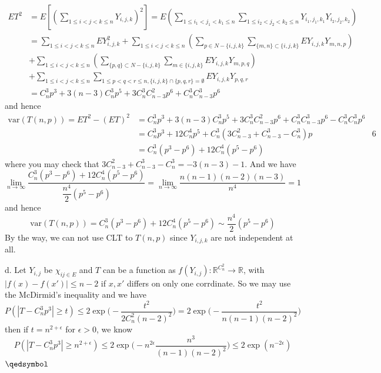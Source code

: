 \documentclass[lang=en,11pt,a4paper,citestyle =authoryear]{elegantpaper}
\newcommand{\prvd}{$\hfill \qedsymbol$}
\newcommand{\R}{\mathbb{R}}
\begin{document}
\[\begin{aligned}
ET^2 &= E[(\sum\limits_{1\leq i < j < k \leq n} Y_{i,j,k})^2] = E(\sum\limits_{1\leq i_1 < j_1 < k_1 \leq n}\sum\limits_{1\leq i_2 < j_2 < k_2 \leq n} Y_{i_1,j_1,k_1} Y_{i_2,j_2,k_2}) \\
&= \sum\limits_{1\leq i < j < k \leq n} EY_{i,j,k}^2 + \sum\limits_{1\leq i < j < k\leq n} (\sum\limits_{p\in N-\{i,j,k\}}\sum\limits_{\{m,n\} \subset \{i,j,k\}}EY_{i,j,k}Y_{m,n,p}) \\
&+ \sum\limits_{1\leq i < j < k\leq n} (\sum\limits_{\{p,q\}\subset N-\{i,j,k\}}\sum\limits_{m\in\{i,j,k\}}EY_{i,j,k}Y_{m,p,q}) \\
&+ \sum\limits_{1\leq i < j < k \leq n} \sum\limits_{1\leq p < q < r \leq n, \{i,j,k\}\cap\{p,q,r\} = \emptyset} EY_{i,j,k}Y_{p,q,r} \\
&= C_n^3 p^3 + 3(n-3)C_n^3 p^5 + 3C_n^3C_{n-3}^2p^6 + C_n^3C_{n-3}^3p^6
\end{aligned}
\]
and hence
\[
\begin{aligned}
\text{var}(T(n,p)) = ET^2 -(ET)^2 &= C_n^3 p^3 + 3(n-3)C_n^3 p^5 + 3C_n^3C_{n-3}^2p^6 + C_n^3C_{n-3}^3p^6 - C_n^3C_n^3 p^6 \\
&= C_n^3 p^3 + 12 C_n^4 p^5 + C_n^3(3C_{n-3}^2 + C_{n-3}^3 - C_n^3)p&6 \\
&= C_n^3(p^3-p^6) + 12 C_n^4(p^5-p^6)
\end{aligned}
\]
where you may check that $3C_{n-3}^2 + C_{n-3}^3 - C_n^3 = -3(n-3)-1$. And we have
\[
\lim_{n\to\infty}  \dfrac{C_n^3(p^3-p^6) + 12 C_n^4(p^5-p^6)}{\dfrac{n^4}{2}(p^5-p^6)} = \lim_{n\to\infty} \dfrac{n(n-1)(n-2)(n-3)}{n^4} = 1
\]
and hence 
\[\text{var}(T(n,p)) = C_n^3(p^3-p^6) + 12 C_n^4(p^5-p^6) \sim \dfrac{n^4}{2}(p^5-p^6)\]
By the way, we can not use CLT to $T(n,p)$ since $Y_{i,j,k}$ are not independent at all.\par
d. Let $Y_{i,j}$ be $\chi_{ij\in E}$ and $T$ can be a function as $f(Y_{i,j}):\R^{C_n^2} \to \R$, with $|f(x)-f(x')| \leq n-2$ if $x,x'$ differs on only one corrdinate. So we may use the McDirmid's inequality and we have
\[
P(|T-C_n^3p^3| \geq t) \leq 2\exp\Big(-\dfrac{t^2}{2C_n^2(n-2)^2}\Big) = 2\exp\Big(-\dfrac{t^2}{n(n-1)(n-2)^2}\Big)
\]
then if $t = n^{2+\epsilon}$ for $\epsilon > 0$, we know
\[
P(|T-C_n^3p^3| \geq n^{2+\epsilon}) \leq 2\exp\Big(-n^{2\epsilon}\dfrac{n^{3}}{(n-1)(n-2)^2}\Big) \leq 2\exp(n^{-2\epsilon})
\]
\prvd
\vspace{0.5em}
\end{document}
